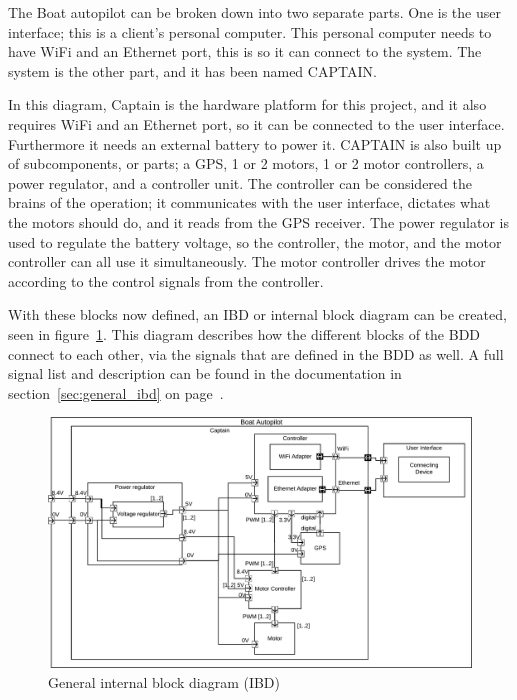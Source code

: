 The Boat autopilot can be broken down into two separate parts. One is the user interface; this is a client's personal computer. This personal computer needs to have WiFi and an Ethernet port, this is so it can connect to the system. The system is the other part, and it has been named CAPTAIN. 

In this diagram, Captain is the hardware platform for this project, and it also requires WiFi and an Ethernet port, so it can be connected to the user interface. Furthermore it needs an external battery to power it.  CAPTAIN is also built up of subcomponents, or parts; a GPS, 1 or 2 motors, 1 or 2 motor controllers, a power regulator, and a controller unit. The controller can be considered the brains of the operation; it communicates with the user interface, dictates what the motors should do, and it reads from the GPS receiver. The power regulator is used to regulate the battery voltage, so the controller, the motor, and the motor controller can all use it simultaneously. The motor controller drives the motor according to the control signals from the controller. 

With these blocks now defined, an IBD or internal block diagram can be created, seen in figure~\ref{fig:generalibd}. This diagram describes how the different blocks of the BDD connect to each other, via the signals that are defined in the BDD as well. A full signal list and description can be found in the documentation in section~\ref{sec:general_ibd} on page~\pageref{sec:general_ibd}.
\begin{figure}[H]
\centering
\includegraphics[width=1\linewidth]{../Appendix/Project/Dokumentation/Images/System_architecture/General_IBD}
\caption{General internal block diagram (IBD)}
\label{fig:generalibd}
\end{figure}

